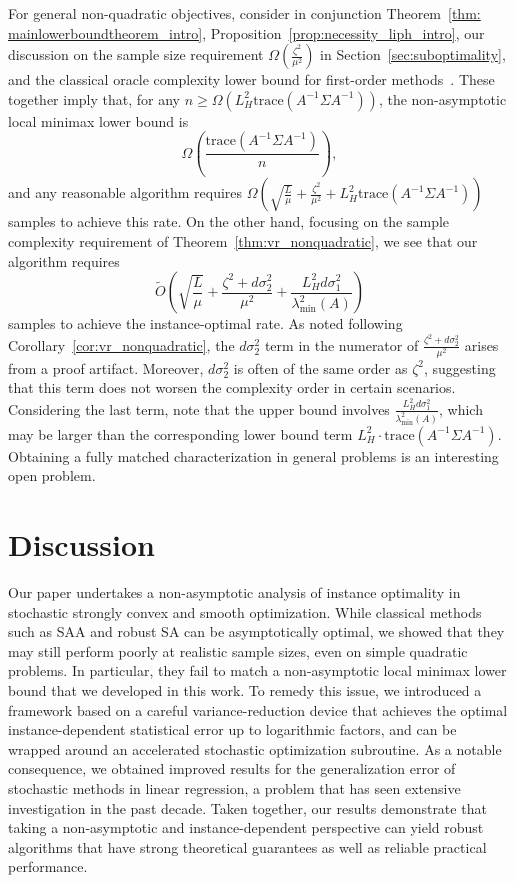 \documentclass[11pt,twoside]{article}
\numberwithin{equation}{section}
\newcommand{\trace}[1]{\mathrm{trace}\left(#1\right)}
\newcommand{\1}{\mathbf{1}}
\theoremstyle{remark}
\theoremstyle{plain}
\newcommand{\liph}{L_H}
\begin{document}
For general non-quadratic objectives, consider in conjunction Theorem~\ref{thm: mainlowerboundtheorem_intro}, Proposition~\ref{prop:necessity_liph_intro},   our discussion on the sample size requirement $\Omega\left(\frac{\zeta^2}{\mu^2}\right)$  in Section~\ref{sec:suboptimality}, and the classical oracle complexity lower bound for first-order methods~\cite{complexity}. These together imply that,  for any  $n \ge \Omega(\liph^2 \trace{A^{-1}\Sigma A^{-1}})$, the non-asymptotic local minimax lower bound is 
$$ \Omega \left(\frac{ \trace{A^{-1} \Sigma A^{-1}}}{n}\right),$$
and any reasonable algorithm requires $\Omega\left( \sqrt{\frac{L}{\mu}} + \frac{\zeta^2}{\mu^2} + \liph^2  \trace{A^{-1} \Sigma A^{-1}}\right)$ samples to achieve this rate. On the other hand, focusing on the sample complexity requirement of Theorem~\ref{thm:vr_nonquadratic}, we see that our algorithm requires 
$$
\tilde O\left(\sqrt{\frac{L}{\mu}} + \frac{\zeta^2 + d\sigma_2^2 }{\mu^2}  + \frac{ \liph^2 d \sigma_1^2}{\lambda_{\min}^2(A)} \right)
$$
samples to achieve the instance-optimal rate.
As noted following Corollary~\ref{cor:vr_nonquadratic}, the $d\sigma_2^2$ term in the numerator of $\frac{\zeta^2 + d\sigma_2^2}{\mu^2}$ arises from a proof artifact. Moreover,  $d\sigma_2^2$ is often of the same order as $\zeta^2$, suggesting that this term does not worsen the complexity order in certain scenarios. Considering the last term, note that the upper bound involves $\frac{ \liph^2 d \sigma_1^2}{\lambda_{\min}^2(A)}$, which may be larger than the corresponding lower bound term $\liph^2 \cdot \trace{A^{-1} \Sigma A^{-1}}$.  Obtaining a fully matched characterization in general problems is an interesting open problem.

\section{Discussion}

Our paper undertakes a non-asymptotic analysis of instance optimality in stochastic strongly convex and smooth optimization. While classical methods such as SAA and robust SA can be asymptotically optimal, we showed that they may still perform poorly at realistic sample sizes, even on simple quadratic problems. In particular, they fail to match a non-asymptotic local minimax lower bound that we developed in this work. To remedy this issue,  we introduced a framework based on a careful variance-reduction device that achieves the optimal instance-dependent statistical error up to logarithmic factors, and can be wrapped around an accelerated stochastic optimization subroutine. As a notable consequence, we obtained improved results for the generalization error of stochastic methods in linear regression, a problem that has seen extensive investigation in the past decade. Taken together, our results demonstrate that taking a non-asymptotic and instance-dependent perspective can yield robust algorithms that have strong theoretical guarantees as well as reliable practical performance.
\end{document}
